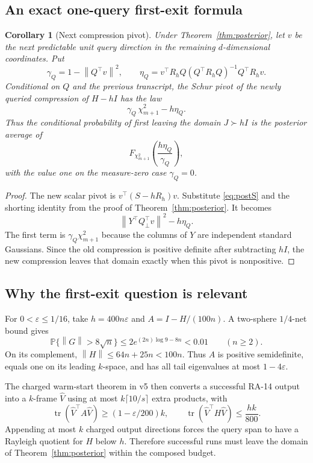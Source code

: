 \documentclass[11pt]{article}
\newtheorem{corollary}[theorem]{Corollary}
\theoremstyle{definition}
\newcommand{\Prob}{\mathbb P}
\newcommand{\tr}{\operatorname{tr}}
\newcommand{\norm}[1]{\left\lVert#1\right\rVert}
\begin{document}
\subsection{An exact one-query first-exit formula}
\begin{corollary}[Next compression pivot]\label{cor:exit}
Under Theorem~\ref{thm:posterior}, let $v$ be the next predictable unit query direction in the remaining $d$-dimensional coordinates. Put
\[
\gamma_Q=1-\norm{Q^\top v}^2,
\qquad \eta_Q=v^\top R_hQ(Q^\top R_hQ)^{-1}Q^\top R_hv.
\]
Conditional on $Q$ and the previous transcript, the Schur pivot of the newly queried compression of $H-hI$ has the law
\begin{equation}\label{eq:exitlaw}
\gamma_Q\,\chi^2_{m+1}-h\eta_Q.
\end{equation}
Thus the conditional probability of first leaving the domain $J\succ hI$ is the posterior average of
\begin{equation}\label{eq:exitcdf}
F_{\chi^2_{m+1}}\left(\frac{h\eta_Q}{\gamma_Q}\right),
\end{equation}
with the value one on the measure-zero case $\gamma_Q=0$.
\end{corollary}
\begin{proof}
The new scalar pivot is $v^\top(S-hR_h)v$. Substitute \eqref{eq:postS} and the shorting identity from the proof of Theorem~\ref{thm:posterior}. It becomes
\[
\norm{Y^\top Q_\perp^\top v}^2-h\eta_Q.
\]
The first term is $\gamma_Q\chi^2_{m+1}$ because the columns of $Y$ are independent standard Gaussians. Since the old compression is positive definite after subtracting $hI$, the new compression leaves that domain exactly when this pivot is nonpositive.
\end{proof}

\subsection{Why the first-exit question is relevant}
For $0<\varepsilon\le1/16$, take $h=400n\varepsilon$ and $A=I-H/(100n)$. A two-sphere $1/4$-net bound gives
\[
\Prob\{\norm G>8\sqrt n\}
\le2e^{(2n)\log9-8n}<0.01\qquad(n\ge2).
\]
On its complement, $\norm H\le64n+25n<100n$. Thus $A$ is positive semidefinite, equals one on its leading $k$-space, and has all tail eigenvalues at most $1-4\varepsilon$.

The charged warm-start theorem in v5 then converts a successful RA-14 output into a $k$-frame $\widehat V$ using at most $k\lceil10/s\rceil$ extra products, with
\[
\tr(\widehat V^\top A\widehat V)\ge(1-\varepsilon/200)k,
\qquad
\tr(\widehat V^\top H\widehat V)\le\frac{hk}{800}.
\]
Appending at most $k$ charged output directions forces the query span to have a Rayleigh quotient for $H$ below $h$. Therefore successful runs must leave the domain of Theorem~\ref{thm:posterior} within the composed budget.
\end{document}
